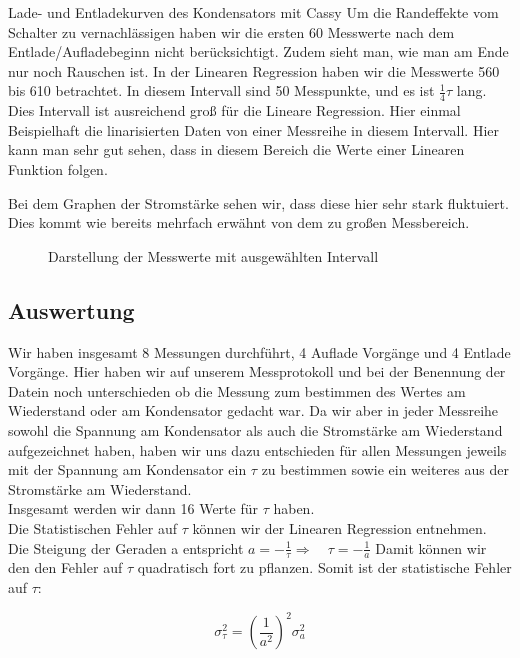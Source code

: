 \documentclass[twoside]{protokoll}
\begin{document}
\begin{aufgabe}{Lade- und Entladekurven des Kondensators mit Cassy}
Um die Randeffekte vom Schalter zu vernachlässigen haben wir die ersten 60 Messwerte nach dem Entlade/Aufladebeginn nicht berücksichtigt.
Zudem sieht man, wie man am Ende nur noch Rauschen ist. In der Linearen Regression haben wir die Messwerte 560 bis 610 betrachtet.
In diesem Intervall sind 50 Messpunkte, und es ist $\frac{1}{4}\tau$ lang. Dies Intervall ist ausreichend groß für die Lineare Regression.  
Hier einmal Beispielhaft die linarisierten Daten von einer Messreihe in diesem Intervall.
Hier kann man sehr gut sehen, dass in diesem Bereich die Werte einer Linearen Funktion folgen.

Bei dem Graphen der Stromstärke sehen wir, dass diese hier sehr stark fluktuiert. Dies kommt wie bereits mehrfach erwähnt von dem zu großen Messbereich. 

\begin{figure}[H]
    \centering
    \hfill
    \caption{Darstellung der Messwerte mit ausgewählten Intervall}
    \centering
\end{figure}
 
\subsection{Auswertung}
Wir haben insgesamt 8 Messungen durchführt, 4 Auflade Vorgänge und 4 Entlade Vorgänge.
Hier haben wir auf unserem Messprotokoll und bei der Benennung der Datein noch unterschieden ob die Messung zum bestimmen des Wertes am Wiederstand oder am Kondensator gedacht war.
Da wir aber in jeder Messreihe sowohl die Spannung am Kondensator als auch die Stromstärke am Wiederstand aufgezeichnet haben, haben wir uns dazu entschieden für allen Messungen jeweils mit der Spannung am Kondensator ein $\tau$ zu bestimmen sowie ein weiteres aus der Stromstärke am Wiederstand. \\
Insgesamt werden wir dann 16 Werte für $\tau$  haben.\\

Die Statistischen Fehler auf $\tau$ können wir der Linearen Regression entnehmen. 
Die Steigung der Geraden a entspricht  $ a = -\frac{1}{\tau} \Rightarrow \quad \tau = - \frac{1}{a}$  Damit können wir den den Fehler auf $\tau$ quadratisch fort zu pflanzen. Somit ist der statistische Fehler auf $\tau$:

\begin{equation}
	\sigma_{\tau}^2 = \left(\frac{1}{a^2}\right)^2 \sigma_a^2
 \end{equation}
 

\end{aufgabe}
\end{document}
